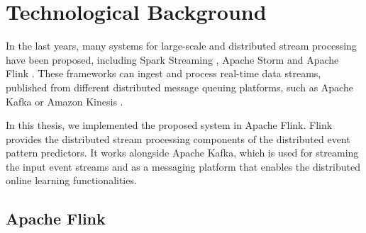 \section{Technological Background}

\par In the last years, many systems for large-scale and distributed stream processing have been proposed, including Spark Streaming \cite{Spark},  Apache Storm \cite{Storm} and Apache Flink \cite{Flink}. These frameworks can ingest and process real-time data streams, published from different distributed message queuing platforms, such as Apache Kafka \cite{Kafka} or  Amazon Kinesis \cite{Kinesis}. 
\par In this thesis, we implemented the proposed system in Apache Flink. Flink provides the distributed stream processing components of the distributed event pattern predictors. It works alongside Apache Kafka, which is used for streaming the input event streams and as a messaging platform that enables the distributed online learning functionalities.





\subsection{Apache Flink}

